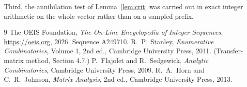 \documentclass[11pt,a4paper]{article}
\theoremstyle{plain}
\theoremstyle{definition}
\begin{document}
Third, the annihilation test of Lemma~\ref{lem:crit} was carried out in exact integer
arithmetic on the whole vector rather than on a sampled prefix.

\begin{thebibliography}{9}
 The OEIS Foundation, \emph{The On-Line Encyclopedia of Integer
Sequences}, \url{https://oeis.org}, 2026. Sequence A249710.
 R.~P.~Stanley, \emph{Enumerative Combinatorics}, Volume 1, 2nd ed.,
Cambridge University Press, 2011. (Transfer-matrix method, Section 4.7.)
 P.~Flajolet and R.~Sedgewick, \emph{Analytic Combinatorics}, Cambridge
University Press, 2009.
 R.~A.~Horn and C.~R.~Johnson, \emph{Matrix Analysis}, 2nd ed., Cambridge
University Press, 2013.
\end{thebibliography}
\end{document}
